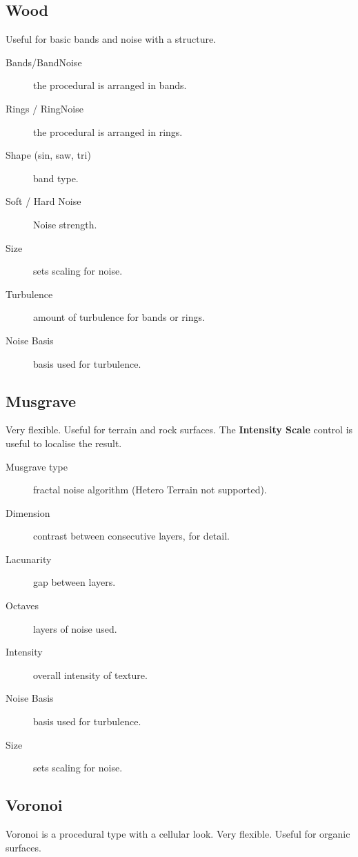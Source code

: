 \subsection{Wood}

Useful for basic bands and noise with a structure.

\begin{description}
\item[Bands/BandNoise] the procedural is arranged in bands.
\item[Rings / RingNoise] the procedural is arranged in rings.
\item[Shape (sin, saw, tri)] band type.
\item[Soft / Hard Noise] Noise strength.
\item[Size] sets scaling for noise.
\item[Turbulence] amount of turbulence for bands or rings.
\item[Noise Basis] basis used for turbulence.
\end{description}

\subsection{Musgrave}

Very flexible. Useful for terrain and rock surfaces. The \textbf{Intensity Scale} control is useful to localise the result.

\begin{description}
\item[Musgrave type] fractal noise algorithm (Hetero Terrain not supported).
\item[Dimension] contrast between consecutive layers, for detail.
\item[Lacunarity] gap between layers.
\item[Octaves] layers of noise used.
\item[Intensity] overall intensity of texture.
\item[Noise Basis] basis used for turbulence.
\item[Size] sets scaling for noise.
\end{description}

\subsection{Voronoi}

Voronoi is a procedural type with a cellular look. Very flexible. Useful for organic surfaces.

